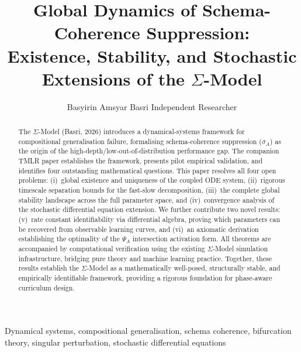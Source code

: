 \documentclass[twoside]{article}
\title{Global Dynamics of Schema-Coherence Suppression:\\
Existence, Stability, and Stochastic Extensions
of the $\Sigma$-Model}
\author{\name Basyirin Amsyar Basri \addr Independent Researcher\\
  \email{basri@sigma-model.dev}
}
\numberwithin{theorem}{section}
\numberwithin{equation}{section}
\begin{document}

\maketitle

\begin{abstract}
The $\Sigma$-Model (Basri, 2026) introduces a dynamical-systems framework
for compositional generalisation failure, formalising schema-coherence
suppression ($\sigma_A$) as the origin of the high-depth/low-out-of-distribution
performance gap. The companion TMLR paper establishes the framework,
presents pilot empirical validation, and identifies four outstanding
mathematical questions. This paper resolves all four open problems:
(i)~global existence and uniqueness of the coupled ODE system,
(ii)~rigorous timescale separation bounds for the fast-slow decomposition,
(iii)~the complete global stability landscape across the full parameter
space, and (iv)~convergence analysis of the stochastic differential
equation extension. We further contribute two novel results:
(v)~rate constant identifiability via differential algebra, proving
which parameters can be recovered from observable learning curves,
and (vi)~an axiomatic derivation establishing the optimality of the
$\Psi_A$ intersection activation form. All theorems are accompanied by
computational verification using the existing $\Sigma$-Model simulation
infrastructure, bridging pure theory and machine learning practice.
Together, these results establish the $\Sigma$-Model as a mathematically
well-posed, structurally stable, and empirically identifiable framework,
providing a rigorous foundation for phase-aware curriculum design.
\end{abstract}

\begin{keywords}
Dynamical systems, compositional generalisation, schema coherence,
bifurcation theory, singular perturbation, stochastic differential equations
\end{keywords}










\end{document}
